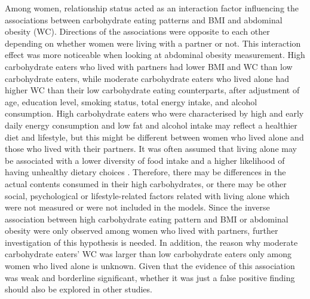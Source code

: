 Among women, relationship status acted as an interaction factor influencing the associations between carbohydrate eating patterns and BMI and abdominal obesity (WC). Directions of the associations were opposite to each other depending on whether women were living with a partner or not. This interaction effect was more noticeable when looking at abdominal obesity measurement. High carbohydrate eaters who lived with partners had lower BMI and WC than low carbohydrate eaters, while moderate carbohydrate eaters who lived alone had higher WC than their low carbohydrate eating counterparts, after adjustment of age, education level, smoking status, total energy intake, and alcohol consumption. High carbohydrate eaters who were characterised by high and early daily energy consumption and low fat and alcohol intake may reflect a healthier diet and lifestyle, but this might be different between women who lived alone and those who lived with their partners. It was often assumed that living alone may be associated with a lower diversity of food intake and a higher likelihood of having unhealthy dietary choices \parencite{hanna2015relationship}. Therefore, there may be differences in the actual contents consumed in their high carbohydrates, or there may be other social, psychological or lifestyle-related factors related with living alone which were not measured or were not included in the models. Since the inverse association between high carbohydrate eating pattern and BMI or abdominal obesity were only observed among women who lived with partners, further investigation of this hypothesis is needed. In addition, the reason why moderate carbohydrate eaters' WC was larger than low carbohydrate eaters only among women who lived alone is unknown. Given that the evidence of this association was weak and borderline significant, whether it was just a false positive finding should also be explored in other studies.












